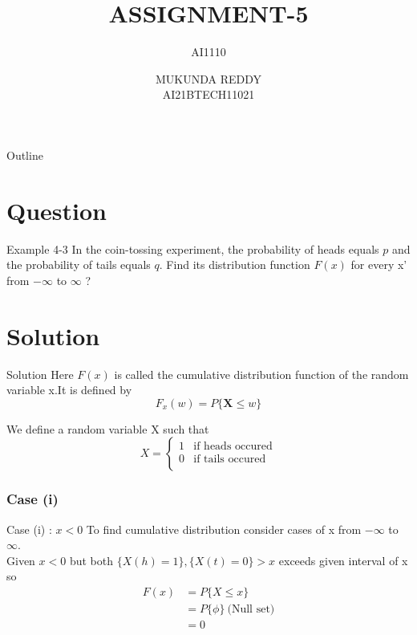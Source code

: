 \documentclass{beamer}
\title[AI1110  Assignment-5]{ASSIGNMENT-5}
\subtitle{AI1110}
\author[]{MUKUNDA REDDY \\ AI21BTECH11021}
\date{}
\begin{document}
  \begin{frame}
      \titlepage
  \end{frame}
  
  \begin{frame}{Outline}
      \tableofcontents
  \end{frame}
  
  \section{Question}
  \begin{frame}{Example 4-3}
     In the coin-tossing experiment, the probability of
     heads equals $p$ and the probability
     of tails equals $q$. Find its distribution function $F(x)$ for every x' from  $-\infty$ to $\infty$ ? \\
  \end{frame}
  
  \section{Solution}
  \begin{frame}{Solution}
     Here $F(x)$  is called the cumulative distribution
     function of the random variable x.It is defined by
     \begin{equation}
     \label{definition}
     F_{\textit{x}} (w) = P\{ \textbf{X} \le \textit{w} \}    
     \end{equation}
     
     We define a random variable X such that
     \[
        X = 
     \begin{cases}
     1 & \text{if heads occured} \\
     0 & \text{if tails occured} \\
     \end{cases}
     \]
  \end{frame}
  
   \subsubsection{Case (i)}
      \begin{frame}{Case (i) : $x < 0$}
      To find cumulative distribution consider cases of x from $-\infty$ to  $\infty$. \\
      Given $x < 0$ but both $\{X(h) = 1\} ,\{X(t) = 0\} > x $  exceeds given interval of x so
      \begin{align}
      F(x) &= P\{X \le x \} \nonumber \\  
     &= P\{ \phi \} \: \text{(Null set)} \nonumber \\  
            &= 0 
      \end{align}
      \end{frame}
      
\end{document}
